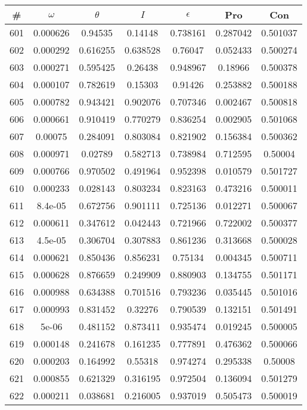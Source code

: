 \newpage
\begin{table}
\begin{tabular}{c|c|c|c|c|c|c}
\# & $\omega$ & $\theta$ & $I$ & $\epsilon$ & Pro & Con\\
\hline
601 & 0.000626 & 0.94535 & 0.14148 & 0.738161 & 0.287042 & 0.501037\\
602 & 0.000292 & 0.616255 & 0.638528 & 0.76047 & 0.052433 & 0.500274\\
603 & 0.000271 & 0.595425 & 0.26438 & 0.948967 & 0.18966 & 0.500378\\
604 & 0.000107 & 0.782619 & 0.15303 & 0.91426 & 0.253882 & 0.500188\\
605 & 0.000782 & 0.943421 & 0.902076 & 0.707346 & 0.002467 & 0.500818\\
606 & 0.000661 & 0.910419 & 0.770279 & 0.836254 & 0.002905 & 0.501068\\
607 & 0.00075 & 0.284091 & 0.803084 & 0.821902 & 0.156384 & 0.500362\\
608 & 0.000971 & 0.02789 & 0.582713 & 0.738984 & 0.712595 & 0.50004\\
609 & 0.000766 & 0.970502 & 0.491964 & 0.952398 & 0.010579 & 0.501727\\
610 & 0.000233 & 0.028143 & 0.803234 & 0.823163 & 0.473216 & 0.500011\\
611 & 8.4e-05 & 0.672756 & 0.901111 & 0.725136 & 0.012271 & 0.500067\\
612 & 0.000611 & 0.347612 & 0.042443 & 0.721966 & 0.722002 & 0.500377\\
613 & 4.5e-05 & 0.306704 & 0.307883 & 0.861236 & 0.313668 & 0.500028\\
614 & 0.000621 & 0.850436 & 0.856231 & 0.75134 & 0.004345 & 0.500711\\
615 & 0.000628 & 0.876659 & 0.249909 & 0.880903 & 0.134755 & 0.501171\\
616 & 0.000988 & 0.634388 & 0.701516 & 0.793236 & 0.035445 & 0.501016\\
617 & 0.000993 & 0.831452 & 0.32276 & 0.790539 & 0.132151 & 0.501491\\
618 & 5e-06 & 0.481152 & 0.873411 & 0.935474 & 0.019245 & 0.500005\\
619 & 0.000148 & 0.241678 & 0.161235 & 0.777891 & 0.476362 & 0.500066\\
620 & 0.000203 & 0.164992 & 0.55318 & 0.974274 & 0.295338 & 0.50008\\
621 & 0.000855 & 0.621329 & 0.316195 & 0.972504 & 0.136094 & 0.501279\\
622 & 0.000211 & 0.038681 & 0.216005 & 0.937019 & 0.505473 & 0.500019\\

\end{tabular}
\end{table}
